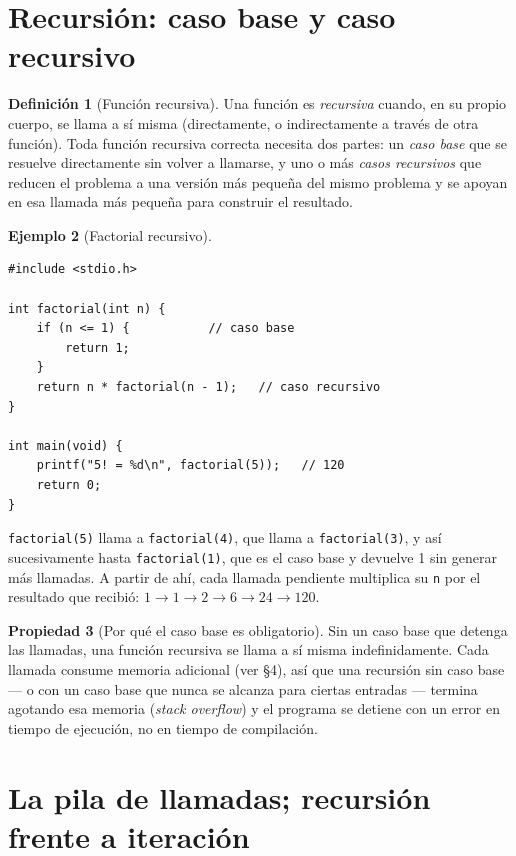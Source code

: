 \documentclass[11pt,letterpaper]{article}
\theoremstyle{definition}
\newtheorem{definicion}{Definición}[section]
\newtheorem{ejemplo}[definicion]{Ejemplo}
\newtheorem{propiedad}[definicion]{Propiedad}
\begin{document}
\section{Recursión: caso base y caso recursivo}

\begin{definicion}[Función recursiva]
Una función es \emph{recursiva} cuando, en su propio cuerpo, se llama a sí misma (directamente, o
indirectamente a través de otra función). Toda función recursiva correcta necesita dos partes: un
\emph{caso base} que se resuelve directamente sin volver a llamarse, y uno o más \emph{casos
recursivos} que reducen el problema a una versión más pequeña del mismo problema y se apoyan en esa
llamada más pequeña para construir el resultado.
\end{definicion}

\begin{ejemplo}[Factorial recursivo]
\begin{lstlisting}
#include <stdio.h>

int factorial(int n) {
    if (n <= 1) {           // caso base
        return 1;
    }
    return n * factorial(n - 1);   // caso recursivo
}

int main(void) {
    printf("5! = %d\n", factorial(5));   // 120
    return 0;
}
\end{lstlisting}
\texttt{factorial(5)} llama a \texttt{factorial(4)}, que llama a \texttt{factorial(3)}, y así
sucesivamente hasta \texttt{factorial(1)}, que es el caso base y devuelve 1 sin generar más
llamadas. A partir de ahí, cada llamada pendiente multiplica su \texttt{n} por el resultado que
recibió: $1 \to 1 \to 2 \to 6 \to 24 \to 120$.
\end{ejemplo}

\begin{propiedad}[Por qué el caso base es obligatorio]
Sin un caso base que detenga las llamadas, una función recursiva se llama a sí misma
indefinidamente. Cada llamada consume memoria adicional (ver \S 4), así que una recursión sin caso
base --- o con un caso base que nunca se alcanza para ciertas entradas --- termina agotando esa
memoria (\emph{stack overflow}) y el programa se detiene con un error en tiempo de ejecución, no en
tiempo de compilación.
\end{propiedad}

\section{La pila de llamadas; recursión frente a iteración}
\end{document}
